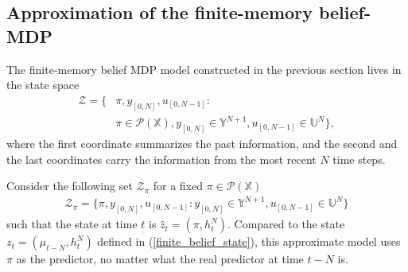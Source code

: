 \documentclass[letterpaper, 10 pt, conference]{ieeeconf}  %
\def\P{{\mathcal P}}
\theoremstyle{definition}
\theoremstyle{remark}
\begin{document}

\subsection{Approximation of the finite-memory belief-MDP}\label{app_section}
The finite-memory belief MDP model constructed in the previous section lives in the state space
\begin{align*}
{\mathcal{Z}}=\bigg\{&\pi,y_{[0,N]},u_{[0,N-1]}:\\
&\pi\in\mathcal{P}(\mathds{X}), y_{[0,N]}\in{\mathds{Y}}^{N+1}, u_{[0,N-1]}\in\mathds{U}^N\bigg\},
\end{align*}
where the first coordinate summarizes the past information, and the second and the last coordinates carry the information from the most recent $N$ time steps.

Consider the following set ${\mathcal{Z}}_{\pi}$ for a fixed $\pi\in\P(\mathds{X})$
\begin{align*}%
{\mathcal{Z}}_{\pi}=\bigg\{\pi,y_{[0,N]},u_{[0,N-1]}: y_{[0,N]}\in{\mathds{Y}}^{N+1}, u_{[0,N-1]}\in\mathds{U}^N\bigg\}
\end{align*}
such that the state at time $t$ is $\hat{z}_t=(\pi,h_t^N)$. Compared to the state ${z}_t=(\mu_{t-N},h_t^N)$ defined in (\ref{finite_belief_state}), this approximate model uses $\pi$ as the predictor, no matter what the real predictor at time $t-N$ is.
\end{document}
